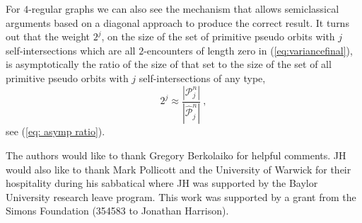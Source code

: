 \documentclass[doublecol]{epl2}
\begin{document}
For $4$-regular graphs we can also see the mechanism that allows semiclassical arguments based on a diagonal approach to produce the correct result.   
 It turns out that the weight $2^j$, on the size of the set of primitive pseudo orbits with $j$ self-intersections which are all $2$-encounters of length zero in (\ref{eq:variancefinal}), is asymptotically the ratio of the size of that set to the size of the set of all primitive pseudo orbits with $j$ self-intersections of any type,
\begin{equation}\label{eq: ratio}
2^j\approx  \frac{|\mathcal{P}^n_j|}{|\widehat{\mathcal{P}}_{j}^n|} \  ,
\end{equation}
see (\ref{eq: asymp ratio}).


\acknowledgments
The authors would like to thank Gregory Berkolaiko for helpful comments.
JH would also like to thank Mark Pollicott and the University of Warwick for their
hospitality during his sabbatical where JH was
supported by the Baylor University research leave program. This work was 
supported by a grant from the Simons Foundation (354583 to Jonathan Harrison).
\end{document}
